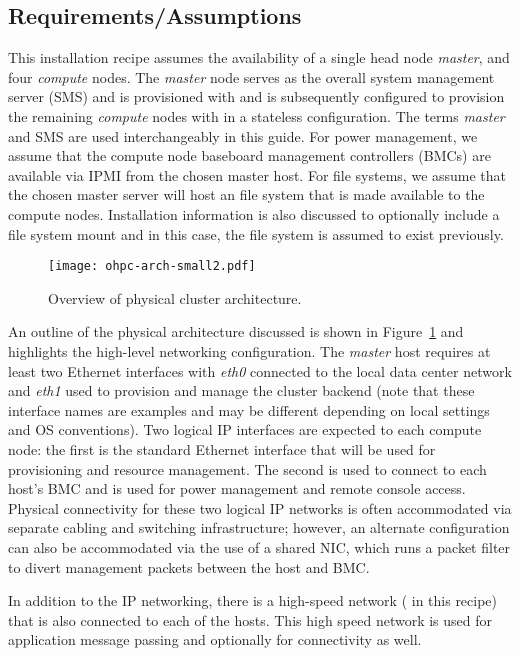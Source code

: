 \subsection{Requirements/Assumptions}
This installation recipe assumes the availability of a single head node {\em
 master}, and four {\em compute} nodes. The {\em master} node serves as the
overall system management server (SMS) and is provisioned with \baseOS{} and is
subsequently configured to provision the remaining {\em compute} nodes with
\Warewulf{} in a stateless configuration. The terms {\em master} and SMS are
used interchangeably in this guide. For power management, we assume that
the compute node baseboard management controllers (BMCs) are available via IPMI
from the chosen master host. For file systems, we assume that the chosen master
server will host an \NFS{} file system that is made available to the compute
nodes. Installation information is also discussed to optionally include a
\Lustre{} file system mount and in this case, the \Lustre{} file system is
assumed to exist previously.

\begin{figure}[hbt]
\center
\texttt{[image: ohpc-arch-small2.pdf]}
\vspace*{-0.2cm}
\caption{Overview of physical cluster architecture.} \label{fig:physical_arch}
\end{figure}
\mbox{}

An outline of the physical architecture discussed is shown in
Figure~\ref{fig:physical_arch} and highlights the high-level networking
configuration. The {\em master} host requires at least two Ethernet interfaces
with {\em eth0} connected to the local data center network and {\em eth1} used
to provision and manage the cluster backend (note that these interface names
are examples and may be different depending on local settings and OS
conventions). Two logical IP interfaces are expected to each compute node: the
first is the standard Ethernet interface that will be used for provisioning and
resource management. The second is used to connect to each host's BMC and is
used for power management and remote console access. Physical connectivity for
these two logical IP networks is often accommodated via separate cabling and
switching infrastructure; however, an alternate configuration can also be
accommodated via the use of a shared NIC, which runs a packet filter to divert
management packets between the host and BMC.

 In addition to the IP networking, there is a high-speed network
(\InfiniBand{} in this recipe) that is also connected to each of the
hosts. This high speed network is used for application message passing and
optionally for \Lustre{} connectivity as well.

